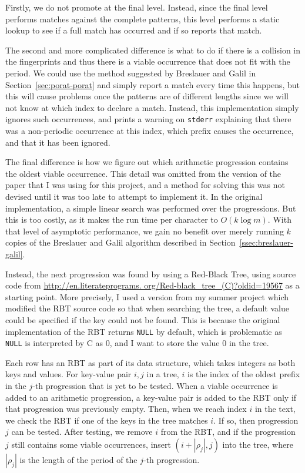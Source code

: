\documentclass[ %
                    author={Dominic Joseph Moylett},
                    degree={MEng},
                     title={Dictionary Matching with Fingerprints},
                  subtitle={An Empirical Analysis},
                      type={research},
                      year={2015} ]{dissertation}
\begin{document}
Firstly, we do not promote at the final level. Instead, since the final level performs matches against the complete patterns, this level performs a static lookup to see if a full match has occurred and if so reports that match.

The second and more complicated difference is what to do if there is a collision in the fingerprints and thus there is a viable occurrence that does not fit with the period. We could use the method suggested by Breslauer and Galil in Section~\ref{sec:porat-porat} and simply report a match every time this happens, but this will cause problems once the patterns are of different lengths since we will not know at which index to declare a match. Instead, this implementation simply ignores such occurrences, and prints a warning on \texttt{stderr} explaining that there was a non-periodic occurrence at this index, which prefix causes the occurrence, and that it has been ignored.

The final difference is how we figure out which arithmetic progression contains the oldest viable occurrence. This detail was omitted from the version of the paper that I was using for this project, and a method for solving this was not devised until it was too late to attempt to implement it. In the original implementation, a simple linear search was performed over the progressions. But this is too costly, as it makes the run time per character to $O(k\log m)$. With that level of asymptotic performance, we gain no benefit over merely running $k$ copies of the Breslauer and Galil algorithm described in Section~\ref{ssec:breslauer-galil}.

Instead, the next progression was found by using a Red-Black Tree, using source code from \url{http://en.literateprograms.
org/Red-black_tree_(C)?oldid=19567} as a starting point. More precisely, I used a version from my summer project which modified the RBT source code so that when searching the tree, a default value could be specified if the key could not be found. This is because the original implementation of the RBT returns \texttt{NULL} by default, which is problematic as \texttt{NULL} is interpreted by C as 0, and I want to store the value 0 in the tree.

Each row has an RBT as part of its data structure, which takes integers as both keys and values. For key-value pair $i, j$ in a tree, $i$ is the index of the oldest prefix in the $j$-th progression that is yet to be tested. When a viable occurrence is added to an arithmetic progression, a key-value pair is added to the RBT only if that progression was previously empty. Then, when we reach index $i$ in the text, we check the RBT if one of the keys in the tree matches $i$. If so, then progression $j$ can be tested. After testing, we remove $i$ from the RBT, and if the progression $j$ still contains some viable occurrences, insert $(i + |\rho_j|, j)$ into the tree, where $|\rho_j|$ is the length of the period of the $j$-th progression.
\end{document}

